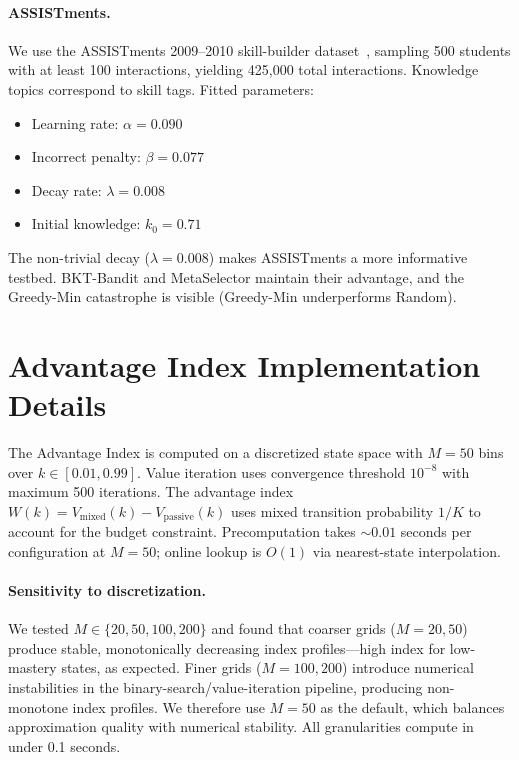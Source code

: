 \paragraph{ASSISTments.}
We use the ASSISTments 2009--2010 skill-builder dataset~\citep{feng2009addressing}, sampling 500 students with at least 100 interactions, yielding 425{,}000 total interactions.
Knowledge topics correspond to skill tags.
Fitted parameters:
\begin{itemize}[leftmargin=*,itemsep=1pt]
    \item Learning rate: $\alpha = 0.090$
    \item Incorrect penalty: $\beta = 0.077$
    \item Decay rate: $\lambda = 0.008$
    \item Initial knowledge: $k_0 = 0.71$
\end{itemize}
The non-trivial decay ($\lambda = 0.008$) makes ASSISTments a more informative testbed.
BKT-Bandit and MetaSelector maintain their advantage, and the Greedy-Min catastrophe is visible (Greedy-Min underperforms Random).

\section{Advantage Index Implementation Details}
\label{app:whittle}

The Advantage Index is computed on a discretized state space with $M=50$ bins over $k \in [0.01, 0.99]$. Value iteration uses convergence threshold $10^{-8}$ with maximum 500 iterations. The advantage index $W(k) = V_{\text{mixed}}(k) - V_{\text{passive}}(k)$ uses mixed transition probability $1/K$ to account for the budget constraint. Precomputation takes ${\sim}0.01$ seconds per configuration at $M{=}50$; online lookup is $O(1)$ via nearest-state interpolation.

\paragraph{Sensitivity to discretization.}
We tested $M \in \{20, 50, 100, 200\}$ and found that coarser grids ($M{=}20, 50$) produce stable, monotonically decreasing index profiles---high index for low-mastery states, as expected. Finer grids ($M{=}100, 200$) introduce numerical instabilities in the binary-search/value-iteration pipeline, producing non-monotone index profiles. We therefore use $M{=}50$ as the default, which balances approximation quality with numerical stability. All granularities compute in under 0.1 seconds.

